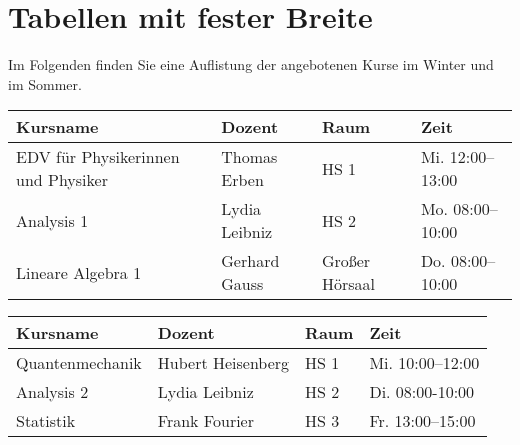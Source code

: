 \documentclass[12pt,a4paper]{scrartcl}
\begin{document}
  \section{Tabellen mit fester Breite}
  Im Folgenden finden Sie eine Auflistung der angebotenen Kurse im
  Winter und im Sommer.
  \begin{table}[htb]
    \centering
    \begin{tabularx}{\linewidth}{Xlll}
      \hline
      Kursname & Dozent & Raum & Zeit \\
      \hline
      EDV für Physikerinnen und Physiker & Thomas Erben & HS 1 & 
        Mi. 12:00--13:00 \\
      Analysis 1 & Lydia Leibniz & HS 2 & 
        Mo. 08:00--10:00 \\
      Lineare Algebra 1 & Gerhard Gauss & 
        Großer Hörsaal & Do. 08:00--10:00\\
      \hline
    \end{tabularx}
  \end{table}
  \begin{table}[htb]
    \centering
    \begin{tabularx}{\linewidth}{XXll}
      \hline
      Kursname & Dozent & Raum & Zeit \\
      \hline
      Quantenmechanik & Hubert Heisenberg & HS 1 & 
        Mi. 10:00--12:00 \\
      Analysis 2 & Lydia Leibniz & HS 2 & 
        Di. 08:00-10:00 \\
      Statistik & Frank Fourier & HS 3 & Fr. 13:00--15:00 \\
      \hline
    \end{tabularx}
  \end{table}
\end{document}
